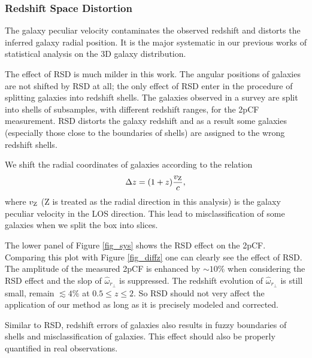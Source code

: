 \documentclass[iop]{emulateapj}
\begin{document}
\subsubsection{Redshift Space Distortion}

The galaxy peculiar velocity contaminates the observed redshift and distorts 
the inferred galaxy radial position.
It is the major systematic in our previous works \citep{Li2014,Li2015,Li2016}
of statistical analysis on the 3D galaxy distribution.

The effect of RSD is much milder in this work. 
The angular positions of galaxies are not shifted by RSD at all;
the only effect of RSD enter in the procedure of 
splitting galaxies into redshift shells.
The galaxies observed in a survey are split into shells of subsamples, 
with different redshift ranges, for the 2pCF measurement.
RSD distorts the galaxy redshift and as a result some galaxies 
(especially those close to the boundaries of shells) are assigned to the wrong redshift shells.

We shift the radial coordinates of galaxies according to the relation 
\begin{equation}\label{eq:zvpeu}
\Delta z = (1+z) \frac{v_{{\rm Z}}}{c},
\end{equation}
where $v_{{\rm Z}}$ (Z is treated as the radial direction in this analysis) 
is the galaxy peculiar velocity in the LOS direction.
This lead to misclassification of some galaxies when we split the box into slices.

The lower panel of Figure \ref{fig_sys} shows the RSD effect on the 2pCF.
Comparing this plot with Figure \ref{fig_diffz} one can clearly see the effect of RSD.
The amplitude of the measured 2pCF is enhanced by $\sim 10\%$ when considering the RSD effect 
and the slop of $\hat\omega_{r_\perp}$ is suppressed.
The redshift evolution of $\hat\omega_{r_\perp}$ is still small, remain $\lesssim4\%$ at $0.5\leq z \leq 2$.
So RSD should not very affect the application of our method as long as it is precisely modeled and corrected.

Similar to RSD, redshift errors of galaxies
also results in fuzzy boundaries of shells and misclassification of galaxies.
This effect should also be properly quantified in real observations.
\end{document}
